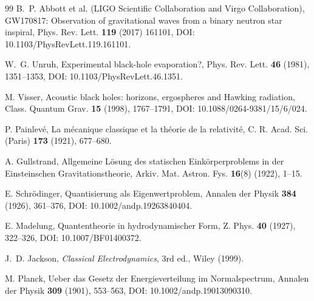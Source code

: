 \documentclass[11pt]{article}
\theoremstyle{definition}
\theoremstyle{plain}
\theoremstyle{remark}
\begin{document}
\begin{thebibliography}{99}
            B.~P. Abbott et al. (LIGO Scientific Collaboration and Virgo Collaboration),
            \newblock GW170817: Observation of gravitational waves from a binary neutron star inspiral,
            \newblock Phys. Rev. Lett. \textbf{119} (2017) 161101,
            \newblock DOI: 10.1103/PhysRevLett.119.161101.

            W.~G. Unruh,
            \newblock Experimental black-hole evaporation?,
            \newblock Phys. Rev. Lett. \textbf{46} (1981), 1351--1353,
            \newblock DOI: 10.1103/PhysRevLett.46.1351.

            M. Visser,
            \newblock Acoustic black holes: horizons, ergospheres and Hawking radiation,
            \newblock Class. Quantum Grav. \textbf{15} (1998), 1767--1791,
            \newblock DOI: 10.1088/0264-9381/15/6/024.

            P. Painlev\'e,
            \newblock La m\'ecanique classique et la th\'eorie de la relativit\'e,
            \newblock C. R. Acad. Sci. (Paris) \textbf{173} (1921), 677--680.

            A. Gullstrand,
            \newblock Allgemeine L\"osung des statischen Eink\"orperproblems in der Einsteinschen Gravitationstheorie,
            \newblock Arkiv. Mat. Astron. Fys. \textbf{16}(8) (1922), 1--15.

            E. Schr\"odinger,
            \newblock Quantisierung als Eigenwertproblem,
            \newblock Annalen der Physik \textbf{384} (1926), 361--376,
            \newblock DOI: 10.1002/andp.19263840404.

            E. Madelung,
            \newblock Quantentheorie in hydrodynamischer Form,
            \newblock Z. Phys. \textbf{40} (1927), 322--326,
            \newblock DOI: 10.1007/BF01400372.

            J.~D. Jackson,
            \newblock \emph{Classical Electrodynamics}, 3rd ed.,
            \newblock Wiley (1999).

            M. Planck,
            \newblock Ueber das Gesetz der Energieverteilung im Normalspectrum,
            \newblock Annalen der Physik \textbf{309} (1901), 553--563,
            \newblock DOI: 10.1002/andp.19013090310.


\end{thebibliography}
\end{document}
